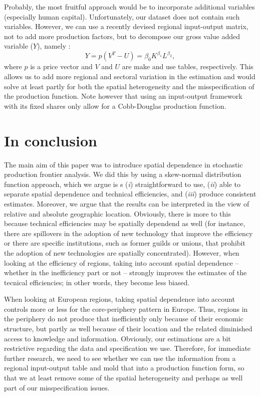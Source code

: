 \documentclass[11pt,parskip,abstracton,notitlepage]{scrartcl}
\begin{document}
%
Probably, the most fruitful approach would be to incorporate additional variables (especially human capital). Unfortunately, our dataset does not contain such variables. However, we can use a recently devised regional input-output matrix, not to add more production factors, but to decompose our gross value added variable ($Y$), namely :
\begin{equation}
		Y = p(V^T - U) = \beta_0 K^{\beta_1}L^{\beta_2},
\label{eq:IO}
\end{equation}
where $p$ is a price vector and $V$ and $U$ are make and use tables, respectively. This allows us to add more regional and sectoral variation in the estimation and would solve at least partly for both the spatial heterogeneity and the misspecification of the production function. Note however that using an input-output framework with its fixed shares only allow for a Cobb-Douglas production function.
%
\section{In conclusion}
%
The main aim of this paper was to introduce spatial dependence in stochastic production frontier analysis. We did this by using a skew-normal distribution function approach, which we argue is s (\emph{i}) straightforward to use,  (\emph{ii}) able to separate spatial dependence and technical efficiencies, and  (\emph{iii}) produce consistent estimates. Moreover, we argue that the results can be interpreted in the view of relative and absolute geographic location. Obviously, there is more to this because technical efficiencies may be spatially dependend as well (for instance, there are spillovers in the adoption of new technology that improve the  efficiency or there are specific institutions, such as former guilds or unions, that prohibit the adoption of new technologies are spatially concentrated). However, when looking at the efficiency of regions, taking into account spatial dependence -- whether in the inefficiency part or not -- strongly improves the estimates of the tecnical efficiencies; in other words, they become less biased. 

When looking at European regions, taking spatial dependence into account controls more or less for the core-periphery pattern in Europe. Thus, regions in the periphery do not produce that inefficiently only because of their economic structure, but partly as well because of their location and the related diminished access to knowledge and information. Obviously, our estimations are a bit restrictive regarding the data and specification we use. Therefore, for immediate further research, we need to see whether we can use the information from a regional input-output table and mold that into a production function form, so that we at least remove some of the spatial heterogeneity and perhaps as well part of our misspecification issues. 
%
\begin{spacing}{1.2}
	\printbibliography
\end{spacing}
\end{document}

